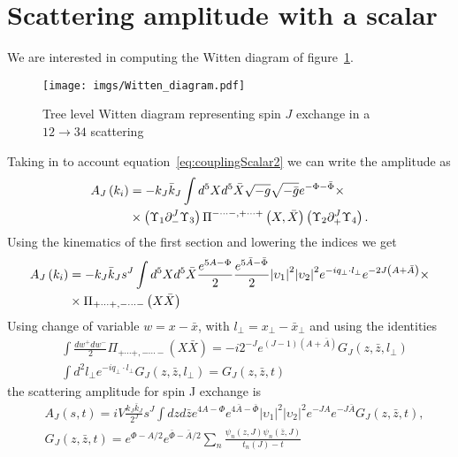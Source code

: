 \documentclass[12pt,a4paper]{article}
\begin{document}
\section{Scattering amplitude with a scalar}
We are interested in computing the Witten diagram of figure~\ref{fig:Witten_diagram}.
\begin{figure}[t!]
\centering
\texttt{[image: imgs/Witten\_diagram.pdf]} 
\caption{Tree level Witten diagram representing spin $J$    exchange in a $12\to34$ scattering}
\label{fig:Witten_diagram}
\end{figure}
Taking in to account equation~\ref{eq:couplingScalar2} we can write the amplitude as
\begin{align}
    A_J \left( k_i \right) &= - k_J \bar{k}_J \int d^5 X d^5 \bar{X} \sqrt{-g} \sqrt{-\bar{g}} e^{-\Phi -\bar{\Phi}} \times \\ \notag
    & \times \left( \Upsilon_1 \partial_{-}^J \Upsilon_3 \right) \Pi^{- \cdots -, + \cdots + } \left(X, \bar{X} \right) \left( \Upsilon_2 \partial_{+}^J \Upsilon_4 \right).
\end{align}
Using the kinematics of the first section and lowering the indices we get
\begin{align}
    A_J \left( k_i \right) &= - k_J \bar{k}_J s^J \int d^5 X d^5 \bar{X} \frac{e^{5A - \Phi}}{2} \frac{e^{5\bar{A} - \bar{\Phi}}}{2} {\left| \upsilon_1 \right|}^2 {\left| \upsilon_2 \right|}^2 e^{- i q_\perp \cdot l_\perp} e^{-2 J \left( A + \bar{A} \right)} \times \\ \notag
    & \times \Pi_{+ \cdots +, - \cdots -} \left(X \bar{X}\right)
\end{align}
Using change of variable $w = x - \bar{x}$, with $l_\perp = x_\perp - \bar{x}_\perp$ and using the identities
\begin{align}
    &\int \frac{d w^+ d w^-}{2} \Pi_{+ \cdots +, - \cdots -} \left(X \bar{X}\right) = -i 2^{-J} e^{\left(J-1\right)\left(A+\bar{A}\right)} G_J \left(z, \bar{z}, l_\perp \right) \\
    &\int d^2 l_\perp e^{- i q_\perp \cdot l_\perp} G_J \left(z, \bar{z}, l_\perp \right) = G_J \left(z, \bar{z}, t \right)
\end{align}
the scattering amplitude for spin J exchange is
\begin{align}
    &A_J \left(s, t \right) = i V \frac{k_J \bar{k}_J}{2^J} s^J \int dz d\bar{z} e^{4 A - \Phi} e^{4 \bar{A} - \bar{\Phi}} {\left| \upsilon_1 \right|}^2 {\left| \upsilon_2 \right|}^2 e^{- J A} e^{- J \bar{A}} G_J \left(z, \bar{z}, t \right), \\
    & G_J \left(z, \bar{z}, t \right) = e^{\Phi - A/2} e^{\bar{\Phi} - \bar{A}/2} \sum_n \frac{\psi_n \left(z, J\right) \psi_n \left(\bar{z}, J\right)}{t_n \left(J\right) - t}
\end{align}
\end{document}
